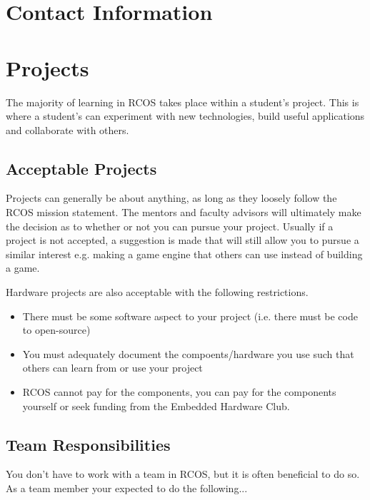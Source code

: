 \documentclass[12pt]{article}
\begin{document}
    \section{Contact Information}


    \section{Projects}

    The majority of learning in RCOS takes place within a student's project. This is where a student's can experiment with new technologies, build useful applications and collaborate with others.

    \subsection{Acceptable Projects}

    Projects can generally be about anything, as long as they loosely follow the RCOS mission statement. The mentors and faculty advisors will ultimately make the decision as to whether or not you can pursue your project. Usually if a project is not accepted, a suggestion is made that will still allow you to pursue a similar interest e.g. making a game engine that others can use instead of building a game.

    Hardware projects are also acceptable with the following restrictions.

    \begin{itemize}
        \item There must be some software aspect to your project (i.e. there must be code to open-source)
        \item You must adequately document the compoents/hardware you use such that others can learn from or use your project
        \item RCOS cannot pay for the components, you can pay for the components yourself or seek funding from the Embedded Hardware Club.
    \end{itemize}

    \subsection{Team Responsibilities}

    You don't have to work with a team in RCOS, but it is often beneficial to do so. As a team member your expected to do the following...
\end{document}
